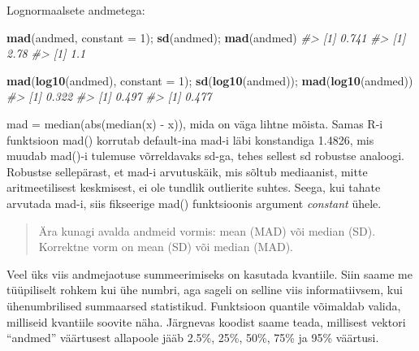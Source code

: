 \documentclass[]{book}
\newenvironment{Shaded}{\begin{snugshade}}{\end{snugshade}}
\newcommand{\CommentTok}[1]{\textcolor[rgb]{0.56,0.35,0.01}{\textit{#1}}}
\newcommand{\DataTypeTok}[1]{\textcolor[rgb]{0.13,0.29,0.53}{#1}}
\newcommand{\DecValTok}[1]{\textcolor[rgb]{0.00,0.00,0.81}{#1}}
\newcommand{\FloatTok}[1]{\textcolor[rgb]{0.00,0.00,0.81}{#1}}
\newcommand{\KeywordTok}[1]{\textcolor[rgb]{0.13,0.29,0.53}{\textbf{#1}}}
\newcommand{\NormalTok}[1]{#1}
\begin{document}
Lognormaalsete andmetega:

\begin{Shaded}
\begin{Highlighting}[]
\KeywordTok{mad}\NormalTok{(andmed, }\DataTypeTok{constant =} \DecValTok{1}\NormalTok{); }\KeywordTok{sd}\NormalTok{(andmed); }\KeywordTok{mad}\NormalTok{(andmed)}
\CommentTok{#> [1] 0.741}
\CommentTok{#> [1] 2.78}
\CommentTok{#> [1] 1.1}
\end{Highlighting}
\end{Shaded}

\begin{Shaded}
\begin{Highlighting}[]
\KeywordTok{mad}\NormalTok{(}\KeywordTok{log10}\NormalTok{(andmed), }\DataTypeTok{constant =} \DecValTok{1}\NormalTok{); }\KeywordTok{sd}\NormalTok{(}\KeywordTok{log10}\NormalTok{(andmed)); }\KeywordTok{mad}\NormalTok{(}\KeywordTok{log10}\NormalTok{(andmed))}
\CommentTok{#> [1] 0.322}
\CommentTok{#> [1] 0.497}
\CommentTok{#> [1] 0.477}
\end{Highlighting}
\end{Shaded}

mad = median(abs(median(x) - x)), mida on väga lihtne mõista. Samas R-i funktsioon mad() korrutab default-ina mad-i läbi konstandiga 1.4826, mis muudab mad()-i tulemuse võrreldavaks sd-ga, tehes sellest sd robustse analoogi. Robustse sellepärast, et mad-i arvutuskäik, mis sõltub mediaanist, mitte aritmeetilisest keskmisest, ei ole tundlik outlierite suhtes. Seega, kui tahate arvutada mad-i, siis fikseerige mad() funktsioonis argument \emph{constant} ühele.

\begin{quote}
Ära kunagi avalda andmeid vormis: mean (MAD) või median (SD).
Korrektne vorm on mean (SD) või median (MAD).
\end{quote}

Veel üks viis andmejaotuse summeerimiseks on kasutada kvantiile. Siin saame me tüüpiliselt rohkem kui ühe numbri, aga sageli on selline viis informatiivsem, kui ühenumbrilised summaarsed statistikud.
Funktsioon quantile võimaldab valida, milliseid kvantiile soovite näha. Järgnevas koodist saame teada, millisest vektori ``andmed'' väärtusest allapoole jääb 2.5\%, 25\%, 50\%, 75\% ja 95\% väärtusi.

\begin{Shaded}
\end{Shaded}
\end{document}
